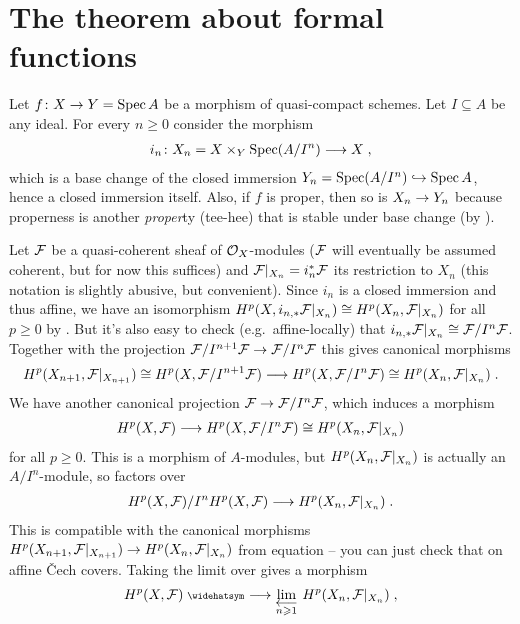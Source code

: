 \documentclass[a4paper,parskip=half,numbers=enddot, DIV=12]{scrreprt}
\renewcommand{\geq}{\geqslant}
\begin{document}
\section{The theorem about formal functions}
Let $f\colon X\morphism Y=\Spec A$ be a  morphism of quasi-compact schemes. Let $I\subseteq A$ be any ideal. For every $n\geq 0$ consider the morphism
\begin{align*}
	i_n\colon X_n=X\times_Y\Spec (A/I^n)\morphism X\;,
\end{align*}
which is a base change of the closed immersion $Y_n=\Spec (A/I^n)\monomorphism \Spec A$, hence a closed immersion itself. Also, if $f$ is proper, then so is $X_n\morphism Y_n$ because properness is another \emph{proper}ty (tee-hee) that is stable under base change (by \cite[Remark~2.4.1]{alggeo2}).

Let $\mathcal{F}$ be a quasi-coherent sheaf of $\mathcal{O}_X$-modules ($\mathcal{F}$ will eventually be assumed coherent, but for now this suffices) and $\mathcal{F}|_{X_n}=i_n ^*\mathcal{F}$ its restriction to $X_n$ (this notation is slightly abusive, but convenient).  Since $i_n$ is a closed immersion and thus affine, we have an isomorphism $H^p(X,i_{n,*}\mathcal{F}|_{X_n})\cong H^p(X_n,\mathcal{F}|_{X_n})$ for all $p\geq 0$ by \cite[Corollary~1.6.1]{alggeo2}. But it's also easy to check (e.g.\ affine-locally) that $i_{n,*}\mathcal{F}|_{X_n}\cong \mathcal{F}/I^n\mathcal{F}$. Together with the projection $ \Ff/I^{n+1}\Ff\morphism \Ff/I^n\Ff$ this gives canonical morphisms 
\begin{align}\lbl{eq:HpXn+1toHpXn}
	H^p(X_{n+1},\Ff|_{X_{n+1}})\cong H^p(X,\Ff/I^{n+1}\Ff)\morphism H^p(X,\Ff/I^n\Ff)\cong H^p(X_n,\Ff|_{X_n})\;.
\end{align}
We have another canonical projection $\Ff\morphism \Ff/I^n\Ff$, which induces a morphism
\begin{align}\lbl{eq:Hmorphism}
	H^p(X,\Ff)\morphism H^p(X,\Ff/I^n\Ff)\cong H^p(X_n,\Ff|_{X_n})
\end{align}
for all $p\geq 0$. This is a morphism of $A$-modules, but $H^p(X_n,\mathcal{F}|_{X_n})$ is actually an $A/I^n$-module, so  factors over
\begin{align}\lbl{eq:Hmorphism2}
	H^p(X,\Ff)/I^nH^p(X,\Ff)\morphism H^p(X_n,\Ff|_{X_n})\;.
\end{align}
This is compatible with the canonical morphisms $H^p(X_{n+1},\Ff|_{X_{n+1}})\morphism H^p(X_n,\Ff|_{X_n})$ from equation  -- you can just check that on affine \v Cech covers. Taking the limit over  gives a morphism
\begin{align}\lbl{eq:formalFunctions}
	H^p(X,\Ff)^\complete\morphism\limit[n\geq 1]H^p(X_n,\Ff|_{X_n})\;,
\end{align}
\end{document}
